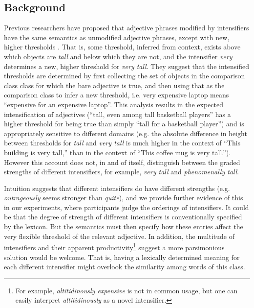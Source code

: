 \documentclass[10pt,letterpaper]{article}
\newcommand{\w}[1]{\emph{#1}}
\newcommand{\todo}[1]{{\color{red}#1}}
\begin{document}
\subsection{Background}
Previous researchers have proposed that adjective phrases modified by intensifiers have the same semantics as unmodified adjective phrases, except with new, higher thresholds \cite{kennedyMcnally, klein, wheeler}. That is, some threshold, inferred from context, exists above which objects are \w{tall} and below which they are not, and the intensifier \w{very} determines a new, higher threshold for \w{very tall}.
They suggest that the intensified thresholds are determined by first collecting the set of objects in the comparison class class for which the bare adjective is true, and then using that as the comparison class to infer a new threshold, i.e. very expensive laptop means “expensive for an expensive laptop”. This analysis results in the expected intensification of adjectives (``tall, even among tall basketball players'' has a higher threshold for being true than simply ``tall for a basketball player'') and is appropriately sensitive to different domains (e.g. the absolute difference in height between thresholds for \w{tall} and \w{very tall} is much higher in the context of ``This building is very tall,'' than in the context of ``This coffee mug is very tall.'').
However this account does not, in and of itself, distinguish between the graded strengths of different intensifiers, for example, \w{very tall} and \w{phenomenally tall}.

Intuition suggests that different intensifiers do have different strengths (e.g. \w{outrageously} seems stronger than \w{quite}), and we provide further evidence of this in our experiments, where participants judge the orderings of intensifiers.
It could be that the degree of strength of different intensifiers is conventionally specified by the lexicon. But the semantics must then specify how these entries affect the very flexible threshold of the relevant adjective.
In addition, the multitude of intensifiers \cite{bolinger} and their apparent productivity\footnote{For example, \w{altitidinously expensive} is not in common usage, but one can easily interpret \w{altitidinously} as a novel intensifier.} suggest a more parsimonious solution would be welcome. 
That is, having a lexically determined meaning for each different intensifier might overlook the similarity among words of this class.
\end{document}
